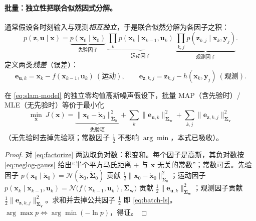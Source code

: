 \paragraph{批量：独立性把联合似然因式分解。}
通常假设各时刻输入与观测\emph{相互独立}，于是联合似然分解为各因子之积\cite{gaoxiang2019slam14,barfoot2024state}：
\begin{equation}
  p(\mathbf{z},\mathbf{u}\mid\mathbf{x})
  =\underbrace{p(\mathbf{x}_0\mid\check{\mathbf{x}}_0)}_{\text{先验因子}}\ \underbrace{\prod_{k}p(\mathbf{x}_k\mid\mathbf{x}_{k-1},\mathbf{u}_k)}_{\text{运动因子}}\ \underbrace{\prod_{k,j}p(\mathbf{z}_{k,j}\mid\mathbf{x}_k,\mathbf{y}_j)}_{\text{观测因子}}.
  \label{eq:factorize}
\end{equation}
定义两类\emph{残差}（误差）：
\begin{equation}
  \mathbf{e}_{\mathbf{u},k}=\mathbf{x}_k-f(\mathbf{x}_{k-1},\mathbf{u}_k)\ (\text{运动}),\qquad
  \mathbf{e}_{\mathbf{z},k,j}=\mathbf{z}_{k,j}-h(\mathbf{x}_k,\mathbf{y}_j)\ (\text{观测}).
  \label{eq:residuals}
\end{equation}

\begin{theorem}\label{thm:map-ls}
在 \cref{eq:slam-model} 的独立零均值高斯噪声假设下，批量 MAP（含先验时）/ MLE（无先验时）等价于最小化
\begin{equation}
  \boxed{\ \min_{\mathbf{x}}\ J(\mathbf{x})
  =\underbrace{\|\mathbf{x}_0-\check{\mathbf{x}}_0\|_{\check{\boldsymbol{\Sigma}}_0}^2}_{\text{先验项}}
  +\sum_{k}\|\mathbf{e}_{\mathbf{u},k}\|_{\boldsymbol{\Sigma}_{\mathbf{w}}}^2
  +\sum_{k,j}\|\mathbf{e}_{\mathbf{z},k,j}\|_{\boldsymbol{\Sigma}_{\mathbf{v}}}^2\ }
  \label{eq:batch-ls}
\end{equation}
（无先验时去掉先验项；常数因子 $\tfrac12$ 不影响 $\arg\min$，本式已吸收）。
\end{theorem}
\begin{proof}
对 \cref{eq:factorize} 两边取负对数：积变和。每个因子是高斯，其负对数按 \cref{eq:neglog-gauss} 给出“半个平方马氏距离 $+$ 与 $\mathbf{x}$ 无关的常数”；常数可丢。先验因子 $p(\mathbf{x}_0\mid\check{\mathbf{x}}_0)=\mathcal{N}(\check{\mathbf{x}}_0,\check{\boldsymbol{\Sigma}}_0)$ 贡献 $\tfrac12\|\mathbf{x}_0-\check{\mathbf{x}}_0\|_{\check{\boldsymbol{\Sigma}}_0}^2$；运动因子 $p(\mathbf{x}_k\mid\mathbf{x}_{k-1},\mathbf{u}_k)=\mathcal{N}\big(f(\mathbf{x}_{k-1},\mathbf{u}_k),\boldsymbol{\Sigma}_{\mathbf{w}}\big)$ 贡献 $\tfrac12\|\mathbf{e}_{\mathbf{u},k}\|_{\boldsymbol{\Sigma}_{\mathbf{w}}}^2$；观测因子贡献 $\tfrac12\|\mathbf{e}_{\mathbf{z},k,j}\|_{\boldsymbol{\Sigma}_{\mathbf{v}}}^2$。求和并去掉公共因子 $\tfrac12$ 即 \cref{eq:batch-ls}。$\arg\max p\Leftrightarrow\arg\min(-\ln p)$，得证。
\end{proof}

